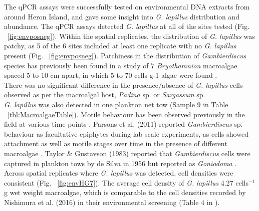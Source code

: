 \documentclass[12pt]{article}
\begin{document}
The qPCR assays were successfully tested on environmental DNA extracts from around Heron Island, and gave some insight into \emph{G. lapillus} distribution and abundance. 
The qPCR assays detected \emph{G. lapillus} at all of the sites tested (Fig. ~\ref{fig:envposneg}). 
Within the spatial replicates, the distribution of \emph{G. lapillus} was patchy, as 5 of the 6 sites included at least one replicate with no \textit{G. lapillus} present (Fig. ~\ref{fig:envposneg}). 
Patchiness in the distribution of \textit{Gambierdiscus} species has previously been found in a study of 7 \emph{Bryothamnion} macroalgae spaced 5 to 10 cm apart, in which 5 to 70 cells g-1 algae were found \citep{taylor1986underwater}.\\
There was no significant difference in the presence/absence of \emph{G. lapillus} cells observed as per the macroalgal host, \emph{Padina} sp. or \emph{Sargassum} sp.\\
\emph{G. lapillus} was also detected in one plankton net tow (Sample 9 in Table ~\ref{tbl:MacroalgaeTable}). 
Motile behaviour has been observed previously in the field at various time points \citep{yasumoto1977finding,bomber1987ecology}. 
Parsons et al. (2011) reported \emph{Gambierdiscus} sp. behaviour as facultative epiphytes during lab scale experiments, as cells showed attachment as well as motile stages over time in the presence of different macroalgae \citep{parsons2011examination}. 
Taylor \& Gustavson (1983) reported that \emph{Gambierdiscus} cells were captured in plankton tows by de Silva in 1956 but reported as \emph{Goniodoma} \citep{taylor1986underwater}.
Across spatial replicates where \emph{G. lapillus} was detected, cell densities were consistent (Fig. ~\ref{fig:envHG7}). 
The average cell density of \emph{G. lapillus} 4.27 cells$^{-1}$g wet weight macroalgae, which is comparable to the cell densities recorded by Nishimura et al. (2016) in their environmental screening (Table 4 in \citep{nishimura2016quantitative}).\\
\end{document}
